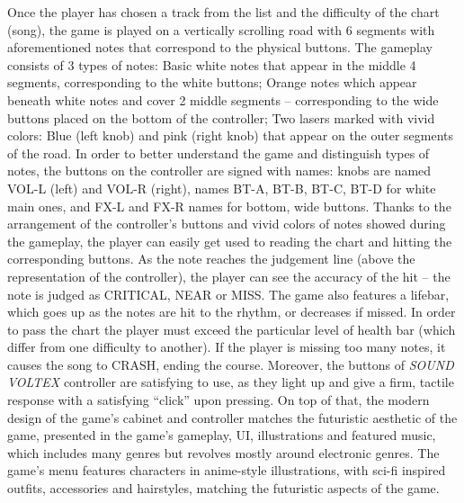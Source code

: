 Once the player has chosen a track from the list and the difficulty of the chart (song), the game is played on a vertically scrolling road with 6 segments with aforementioned notes that correspond to the physical buttons. The gameplay consists of 3 types of notes: Basic white notes that appear in the middle 4 segments, corresponding to the white buttons; Orange notes which appear beneath white notes and cover 2 middle segments -- corresponding to the wide buttons placed on the bottom of the controller; Two lasers marked with vivid colors: Blue (left knob) and pink (right knob) that appear on the outer segments of the road. In order to better understand the game and distinguish types of notes, the buttons on the controller are signed with names: knobs are named VOL-L (left) and VOL-R (right), names BT-A, BT-B, BT-C, BT-D for white main ones, and FX-L and FX-R names for bottom, wide buttons. Thanks to the arrangement of the controller’s buttons and vivid colors of notes showed during the gameplay, the player can easily get used to reading the chart and hitting the corresponding buttons. As the note reaches the judgement line (above the representation of the controller), the player can see the accuracy of the hit -- the note is judged as CRITICAL, NEAR or MISS. The game also features a lifebar, which goes up as the notes are hit to the rhythm, or decreases if missed. In order to pass the chart the player must exceed the particular level of health bar (which differ from one difficulty to another). If the player is missing too many notes, it causes the song to CRASH, ending the course. Moreover, the buttons of \textit{SOUND VOLTEX} controller are satisfying to use, as they light up and give a firm, tactile response with a satisfying ``click'' upon pressing. On top of that, the modern design of the game’s cabinet and controller matches the futuristic aesthetic of the game, presented in the game’s gameplay, UI, illustrations and featured music, which includes many genres but revolves mostly around electronic genres. The game’s menu features characters in anime-style illustrations, with sci-fi inspired outfits, accessories and hairstyles, matching the futuristic aspects of the game. 

